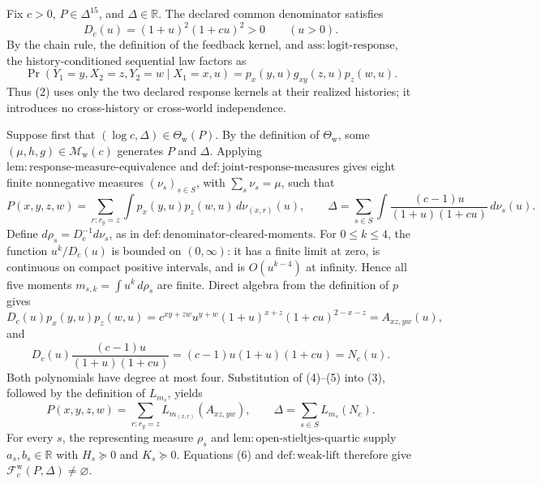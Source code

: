 Fix \(c>0\), \(P\in\Delta^{15}\), and \(\Delta\in\mathbb R\).  The declared common denominator satisfies
\[
 D_c(u)=(1+u)^2(1+cu)^2>0\qquad(u>0). \tag{1}
\]
By the chain rule, the definition of the feedback kernel, and \(\mathrm{ass{:}logit\text{-}response}\), the history-conditioned sequential law factors as
\[
 \Pr(Y_1=y,X_2=z,Y_2=w\mid X_1=x,u)
 =p_x(y,u)g_{xy}(z,u)p_z(w,u). \tag{2}
\]
Thus (2) uses only the two declared response kernels at their realized histories; it introduces no cross-history or cross-world independence.

Suppose first that \((\log c,\Delta)\in\Theta_{\mathrm w}(P)\).  By the definition of \(\Theta_{\mathrm w}\), some \((\mu,h,g)\in\mathcal M_{\mathrm w}(c)\) generates \(P\) and \(\Delta\).  Applying \(\mathrm{lem{:}response\text{-}measure\text{-}equivalence}\) and \(\mathrm{def{:}joint\text{-}response\text{-}measures}\) gives eight finite nonnegative measures \((\nu_s)_{s\in S}\), with \(\sum_s\nu_s=\mu\), such that
\[
 P(x,y,z,w)=\sum_{r:r_y=z}\int p_x(y,u)p_z(w,u)\,d\nu_{(x,r)}(u),
 \qquad
 \Delta=\sum_{s\in S}\int
 \frac{(c-1)u}{(1+u)(1+cu)}\,d\nu_s(u). \tag{3}
\]
Define \(d\rho_s=D_c^{-1}d\nu_s\), as in \(\mathrm{def{:}denominator\text{-}cleared\text{-}moments}\).  For \(0\le k\le4\), the function \(u^k/D_c(u)\) is bounded on \((0,\infty)\): it has a finite limit at zero, is continuous on compact positive intervals, and is \(O(u^{k-4})\) at infinity.  Hence all five moments \(m_{s,k}=\int u^k\,d\rho_s\) are finite.  Direct algebra from the definition of \(p\) gives
\[
 D_c(u)p_x(y,u)p_z(w,u)
 =c^{xy+zw}u^{y+w}(1+u)^{x+z}(1+cu)^{2-x-z}
 =A_{xz,yw}(u), \tag{4}
\]
and
\[
 D_c(u)\frac{(c-1)u}{(1+u)(1+cu)}
 =(c-1)u(1+u)(1+cu)=N_c(u). \tag{5}
\]
Both polynomials have degree at most four.  Substitution of (4)--(5) into (3), followed by the definition of \(L_{m_s}\), yields
\[
 P(x,y,z,w)=\sum_{r:r_y=z}L_{m_{(x,r)}}(A_{xz,yw}),
 \qquad
 \Delta=\sum_{s\in S}L_{m_s}(N_c). \tag{6}
\]
For every \(s\), the representing measure \(\rho_s\) and \(\mathrm{lem{:}open\text{-}stieltjes\text{-}quartic}\) supply \(a_s,b_s\in\mathbb R\) with \(H_s\succeq0\) and \(K_s\succeq0\).  Equations (6) and \(\mathrm{def{:}weak\text{-}lift}\) therefore give \(\mathcal F_c^{\mathrm w}(P,\Delta)\ne\varnothing\).


